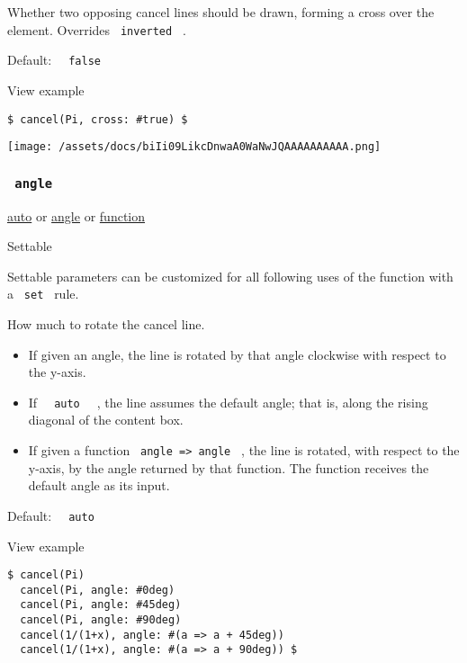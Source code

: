 Whether two opposing cancel lines should be drawn, forming a cross over
the element. Overrides \texttt{\ inverted\ } .

Default: \texttt{\ }{\texttt{\ false\ }}\texttt{\ }


View example

\begin{verbatim}
$ cancel(Pi, cross: #true) $
\end{verbatim}

\texttt{[image: /assets/docs/biIi09LikcDnwaA0WaNwJQAAAAAAAAAA.png]}

\subsubsection{\texorpdfstring{\texttt{\ angle\ }}{ angle }}\label{parameters-angle}

\href{/docs/reference/foundations/auto/}{auto} {or}
\href{/docs/reference/layout/angle/}{angle} {or}
\href{/docs/reference/foundations/function/}{function}

{{ Settable }}

\label{parameters-angle-settable-tooltip}
Settable parameters can be customized for all following uses of the
function with a \texttt{\ set\ } rule.

How much to rotate the cancel line.

\begin{itemize}
\tightlist
\item
  If given an angle, the line is rotated by that angle clockwise with
  respect to the y-axis.
\item
  If \texttt{\ }{\texttt{\ auto\ }}\texttt{\ } , the line assumes the
  default angle; that is, along the rising diagonal of the content box.
\item
  If given a function \texttt{\ angle\ =\textgreater{}\ angle\ } , the
  line is rotated, with respect to the y-axis, by the angle returned by
  that function. The function receives the default angle as its input.
\end{itemize}

Default: \texttt{\ }{\texttt{\ auto\ }}\texttt{\ }


View example

\begin{verbatim}
$ cancel(Pi)
  cancel(Pi, angle: #0deg)
  cancel(Pi, angle: #45deg)
  cancel(Pi, angle: #90deg)
  cancel(1/(1+x), angle: #(a => a + 45deg))
  cancel(1/(1+x), angle: #(a => a + 90deg)) $
\end{verbatim}

